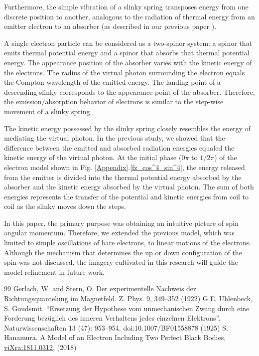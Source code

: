 \documentclass[reprint,amsmath,amssymb,aps,draft]{revtex4-1}
\numberwithin{equation}{section}%
\begin{document}
    Furthermore, the simple vibration of a slinky spring transposes energy from one discrete position to another, analogous to the radiation of thermal energy from an emitter electron to an absorber (as described in our previous paper \cite{Hanamura}).
    
    A single electron particle can be considered as a two-spinor system: a spinor that emits thermal potential energy and a spinor that absorbs that thermal potential energy. The appearance position of the absorber varies with the kinetic energy of the electrons. The radius of the virtual photon surrounding the electron equals the Compton wavelength of the emitted energy. The landing point of a descending slinky corresponds to the appearance point of the absorber. Therefore, the emission/absorption behavior of electrons is similar to the step-wise movement of a slinky spring.
    
    The kinetic energy possessed by the slinky spring closely resembles the energy of mediating the virtual photon. In the previous study, we showed that the difference between the emitted and absorbed radiation energies equaled the kinetic energy of the virtual photon. At the initial phase ($0\pi$ to $1/2 \pi$) of the electron model shown in Fig. \ref{Appendix}.\ref{fz_cos^4_sin^4}, the energy released from the emitter is divided into the thermal potential energy absorbed by the absorber and the kinetic energy absorbed by the virtual photon. The sum of both energies represents the transfer of the potential and kinetic energies from coil to coil as the slinky moves down the steps.
    
    In this paper, the primary purpose was obtaining an intuitive picture of spin angular momentum. Therefore, we extended the previous model, which was limited to simple oscillations of bare electrons, to linear motions of the electrons. Although the mechanism that determines the up or down configuration of the spin was not discussed, the imagery cultivated in this research will guide the model refinement in future work.


\begin{thebibliography}{99}
    Gerlach, W. and Stern, O. Der experimentelle Nachweis der Richtungsquantelung im Magnetfeld. Z. Phys. 9, 349–352 (1922)
    G.E. Uhlenbeck, S. Goudsmit. “Ersetzung der Hypothese vom unmechanischen Zwang durch eine Forderung bezüglich des inneren Verhaltens jedes einzelnen Elektrons”. Naturwissenschaften 13 (47): 953–954. doi:10.1007/BF01558878 (1925)
     S. Hanamura. A Model of an Electron Including Two Perfect Black Bodies, \href{http://vixra.org/abs/1811.0312}{viXra:1811.0312}, (2018)


\end{thebibliography}
\end{document}

